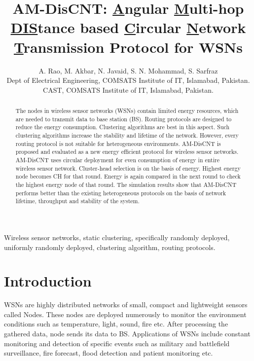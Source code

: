 \documentclass[journal]{IEEEtran}
\begin{document}
\title{AM-DisCNT: \underline{A}ngular \underline{M}ulti-hop \underline{DIS}tance based \underline{C}ircular \underline{N}etwork \underline{T}ransmission Protocol for WSNs}

\author{A. Rao, M. Akbar, N. Javaid, S. N. Mohammad, S. Sarfraz\\\vspace{0.4cm}
Dept of Electrical Engineering, COMSATS Institute of IT, Islamabad, Pakistan.\\
CAST, COMSATS Institute of IT, Islamabad, Pakistan.}

\maketitle
\begin{abstract}
 The nodes in wireless sensor networks (WSNs) contain limited energy resources, which are needed to transmit data to base station (BS). Routing protocols are designed to reduce the energy consumption. Clustering algorithms are best in this aspect. Such clustering algorithms increase the stability and lifetime of the network. However, every routing protocol is not suitable for heterogeneous environments. AM-DisCNT is proposed and evaluated as a new energy efficient protocol for wireless sensor networks. AM-DisCNT uses circular deployment for even consumption of energy in entire wireless sensor network. Cluster-head selection is on the basis of energy. Highest energy node becomes CH for that round. Energy is again compared in the next round to check the highest energy node of that round. The simulation results show that AM-DisCNT performs better than the existing heterogeneous protocols on the basis of network lifetime, throughput and stability of the system.
\end{abstract}

\begin{IEEEkeywords}
Wireless sensor networks, static clustering, specifically randomly deployed, uniformly randomly deployed, clustering algorithm, routing protocols.
\end{IEEEkeywords}
\IEEEpeerreviewmaketitle
\section{Introduction}

WSNs are highly distributed networks of small, compact and lightweight sensors called Nodes. These nodes are deployed numerously to monitor the environment conditions such as temperature, light, sound, fire etc. After processing the gathered data, node sends its data to BS. Applications of WSNs include constant monitoring and detection of specific events such as military and battlefield surveillance, fire forecast, flood detection and patient monitoring etc.
\end{document}
